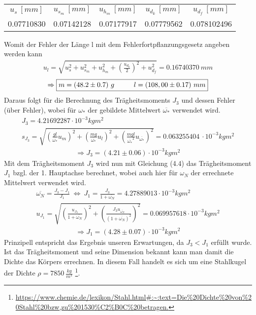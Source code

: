\begin{center}
    \begin{tabular}{ccccc}
        \rowcolor[rgb]{ .741,  .843,  .933}  $u_{s}~[mm]$ &  $u_{s_m}~[mm]$ &  $u_{h_m}~[mm]$ &  $u_{d_k}~[mm]$ &  $u_{d_f}~[mm]$\\
        0.07710830 & 0.07142128 & 0.07177917 & 0.07779562 & 0.078102496
    \end{tabular}
\end{center}
Womit der Fehler der Länge l mit dem Fehlerfortpflanzungsgesetz angeben werden kann
\begin{align}
    u_l=\sqrt{u_s^2+u_{s_m}^2+u_{h_m}^2+\left(\frac{u_{d_k}}{2}\right)^2+u_{d_f}^2}=0.16740370~mm
\end{align}
\begin{align*}
    \Rightarrow\boxed{m=(48.2\pm0.7)~g\tab l=(108,00\pm0.17)~mm}
\end{align*}
Daraus folgt für die Berechnung des Trägheitsmoments $J_3$ und dessen Fehler (über Fehler), wobei für $\omega_*$ der gebildete Mittelwert $\overline{\omega_*}$ verwendet wird. 
\begin{gather}
    J_3 = 4.21692287\cdot10^{-3}kgm^2 \\
    s_{J_3}=\sqrt{\left(\frac{gl}{\overline{\omega_*}}u_m\right)^2+\left(\frac{mg}{\overline{\omega_*}}u_l\right)^2+\left(\frac{mgl}{\overline{\omega_*}^2}u_{\overline{\omega_*}}\right)^2}=0.063255404~\cdot10^{-3}kgm^2
\end{gather}
\begin{align*}
    \Rightarrow\boxed{J_3=(4.21\pm0.06)\cdot10^{-3}kgm^2}
\end{align*}
Mit dem Trägheitsmoment $J_3$ wird nun mit Gleichung (4.4) das Trägheitsmoment $J_1$ bzgl. der 1. Hauptachse berechnet, wobei auch hier für $\omega_N$ der errechnete Mittelwert verwendet wird.
\begin{gather}
    \overline{\omega_N}=\frac{J_3-J_1}{J_1}~\Leftrightarrow~ J_1=\frac{J_3}{1+\overline{\omega_N}}=4.27889013\cdot 10^{-3}kgm^2\\
    u_{J_1}=\sqrt{\left(\frac{u_{J_3}}{1+\overline{\omega_N}}\right)^2+\left(\frac{J_3u_{\overline{\omega_N}}}{(1+\overline{\omega_N})^2}\right)^2}=0.069957618\cdot 10^{-3}kgm^2
\end{gather}
\begin{align*}
    \Rightarrow\boxed{J_1=(4.28\pm0.07)\cdot10^{-3}kgm^2}
\end{align*}
Prinzipell entspricht das Ergebnis unseren Erwartungen, da $J_3<J_1$ erfüllt wurde. Ist das Trägheitsmoment und seine Dimension bekannt kann man damit die Dichte das Körpers errechnen. In diesem Fall handelt es sich um eine Stahlkugel der Dichte $\rho = 7850~\frac{kg}{m^3}$ \footnote{\url{https://www.chemie.de/lexikon/Stahl.html#:~:text=Die%20Dichte%20von%20Stahl%20bzw,zu%201530%C2%B0C%20betragen.}}.\\
